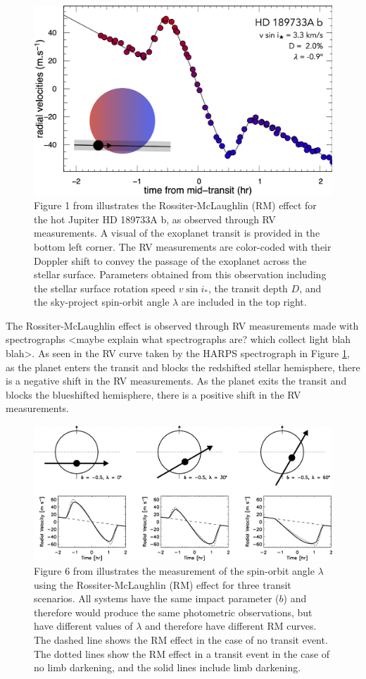 \documentclass[oneside,12pt]{amsart}
\numberwithin{page}{section}
\begin{document}
\begin{figure}[htbp]
    \centering
    \includegraphics[width=0.7\linewidth]{figs/triaud_fig1.png}
    \caption{Figure 1 from \citep{triaud2017rossiter} illustrates the Rossiter-McLaughlin (RM) effect for the hot Jupiter HD 189733A b, as observed through RV measurements. A visual of the exoplanet transit is provided in the bottom left corner. The RV measurements are color-coded with their Doppler shift to convey the passage of the exoplanet across the stellar surface. Parameters obtained from this observation including the stellar surface rotation speed $v \sin i_*$, the transit depth $D$, and the sky-project spin-orbit angle $\lambda$ are included in the top right.}
    \label{fig:triaud-fig1}
\end{figure}

The Rossiter-McLaughlin effect is observed through RV measurements made with spectrographs <maybe explain what spectrographs are? which collect light blah blah>. As seen in the RV curve taken by the HARPS spectrograph in Figure \ref{fig:triaud-fig1}, as the planet enters the transit and blocks the redshifted stellar hemisphere, there is a negative shift in the RV measurements. As the planet exits the transit and blocks the blueshifted hemisphere, there is a positive shift in the RV measurements.

\begin{figure}[htbp]
    \centering
    \includegraphics[width=0.9\linewidth]{figs/winn_fig6.jpg}
    \caption{Figure 6 from \citet{winn2010transits} illustrates the measurement of the spin-orbit angle $\lambda$ using the Rossiter-McLaughlin (RM) effect for three transit scenarios. All systems have the same impact parameter ($b$) and therefore would produce the same photometric observations, but have different values of $\lambda$ and therefore have different RM curves. The dashed line shows the RM effect in the case of no transit event. The dotted lines show the RM effect in a transit event in the case of no limb darkening, and the solid lines include limb darkening.}
    \label{fig:winn-fig6}
\end{figure}
\end{document}
